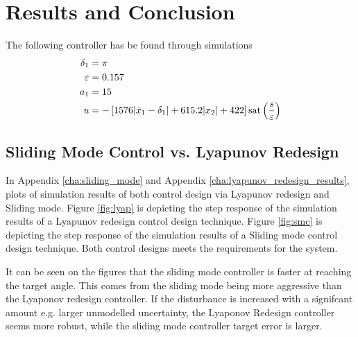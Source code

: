 \section{Results and Conclusion} %
\label{sec:results_and_conclusion}
The following controller has be found through simulations
\begin{equation}
\begin{split}
        \delta_1 &= \pi \\
        \varepsilon &= 0.157\\
        a_1 &= 15 \\
        u &=  -\left[ 1576 \vert \bar{x}_1-\delta_1 \vert + 615.2\vert x_2 \vert + 422 \right]\mathrm{sat}\left(\frac{s}{\varepsilon}\right)\nonumber \\
\end{split}
\end{equation}

\subsection{Sliding Mode Control vs. Lyapunov Redesign} %
\label{sub:sliding_mode_control_vs_lyapunov_redesign}
In Appendix \ref{cha:sliding_mode} and Appendix \ref{cha:lyapunov_redesign_results}, plots of simulation results of both
control design via Lyapunov redesign and Sliding mode. Figure \ref{fig:lyap} is depicting the step response of the
simulation results of a Lyapunov redesign control design technique. Figure \ref{fig:smc} is depicting the step response
of the simulation results of a Sliding mode control design technique. Both control designs meets the requirements for the
system.

It can be seen on the figures that the sliding mode controller is faster at reaching the target angle. This comes from the sliding mode being more aggressive than the Lyaponov redesign controller. If the disturbance is increased with a signifcant amount e.g. larger unmodelled uncertainty, the Lyaponov Redesign controller seems more robust, while the sliding mode controller target error is larger.